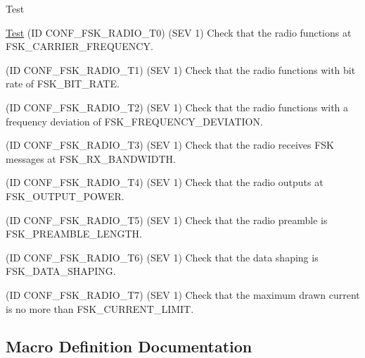 \begin{DoxyRefDesc}{Test}
\item[\hyperlink{test__test000028}{Test}](ID C\+O\+N\+F\+\_\+\+F\+S\+K\+\_\+\+R\+A\+D\+I\+O\+\_\+\+T0) (S\+EV 1) Check that the radio functions at F\+S\+K\+\_\+\+C\+A\+R\+R\+I\+E\+R\+\_\+\+F\+R\+E\+Q\+U\+E\+N\+CY. 

(ID C\+O\+N\+F\+\_\+\+F\+S\+K\+\_\+\+R\+A\+D\+I\+O\+\_\+\+T1) (S\+EV 1) Check that the radio functions with bit rate of F\+S\+K\+\_\+\+B\+I\+T\+\_\+\+R\+A\+TE. 

(ID C\+O\+N\+F\+\_\+\+F\+S\+K\+\_\+\+R\+A\+D\+I\+O\+\_\+\+T2) (S\+EV 1) Check that the radio functions with a frequency deviation of F\+S\+K\+\_\+\+F\+R\+E\+Q\+U\+E\+N\+C\+Y\+\_\+\+D\+E\+V\+I\+A\+T\+I\+ON. 

(ID C\+O\+N\+F\+\_\+\+F\+S\+K\+\_\+\+R\+A\+D\+I\+O\+\_\+\+T3) (S\+EV 1) Check that the radio receives F\+SK messages at F\+S\+K\+\_\+\+R\+X\+\_\+\+B\+A\+N\+D\+W\+I\+D\+TH. 

(ID C\+O\+N\+F\+\_\+\+F\+S\+K\+\_\+\+R\+A\+D\+I\+O\+\_\+\+T4) (S\+EV 1) Check that the radio outputs at F\+S\+K\+\_\+\+O\+U\+T\+P\+U\+T\+\_\+\+P\+O\+W\+ER. 

(ID C\+O\+N\+F\+\_\+\+F\+S\+K\+\_\+\+R\+A\+D\+I\+O\+\_\+\+T5) (S\+EV 1) Check that the radio preamble is F\+S\+K\+\_\+\+P\+R\+E\+A\+M\+B\+L\+E\+\_\+\+L\+E\+N\+G\+TH. 

(ID C\+O\+N\+F\+\_\+\+F\+S\+K\+\_\+\+R\+A\+D\+I\+O\+\_\+\+T6) (S\+EV 1) Check that the data shaping is F\+S\+K\+\_\+\+D\+A\+T\+A\+\_\+\+S\+H\+A\+P\+I\+NG. 

(ID C\+O\+N\+F\+\_\+\+F\+S\+K\+\_\+\+R\+A\+D\+I\+O\+\_\+\+T7) (S\+EV 1) Check that the maximum drawn current is no more than F\+S\+K\+\_\+\+C\+U\+R\+R\+E\+N\+T\+\_\+\+L\+I\+M\+IT.\end{DoxyRefDesc}


\subsection{Macro Definition Documentation}
\mbox{\label{group__defines__radio__non__ism__band__fsk__configuraiton_ga0e39a8b8bddb39a81db0e1296f547f2d}} 
